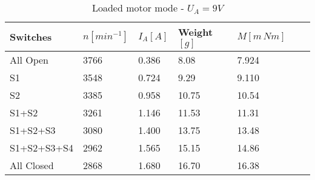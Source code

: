 \begin{table}[htbp]
   \centering
   \begin{tabularx}{\columnwidth}{XXXXXXX}
      \toprule
      Switches    & $n [min^{-1}]$ & $I_A [A]$ & Weight$[g]$ & $M[m\, Nm]$ \\
      \midrule
      All Open    & 3766           & 0.386     & 8.08        & 7.924       \\
      S1          & 3548           & 0.724     & 9.29        & 9.110       \\
      S2          & 3385           & 0.958     & 10.75       & 10.54       \\
      S1+S2       & 3261           & 1.146     & 11.53       & 11.31       \\
      S1+S2+S3    & 3080           & 1.400     & 13.75       & 13.48       \\
      S1+S2+S3+S4 & 2962           & 1.565     & 15.15       & 14.86       \\
      All Closed  & 2868           & 1.680     & 16.70       & 16.38       \\
      \bottomrule
   \end{tabularx}
   \caption{Loaded motor mode - $U_A=9V$}
\end{table}
